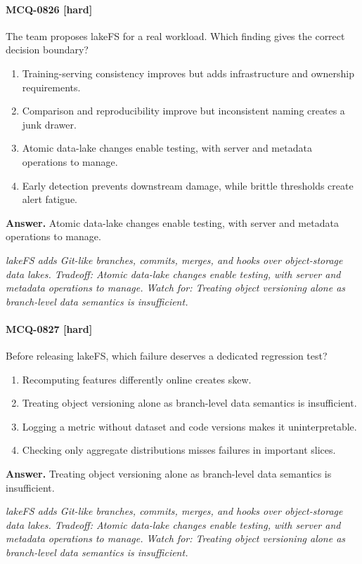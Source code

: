 \paragraph{MCQ-0826 [hard]} The team proposes lakeFS for a real workload. Which finding gives the correct decision boundary?
\begin{enumerate}[label=\Alph*.]
\item Training-serving consistency improves but adds infrastructure and ownership requirements.
\item Comparison and reproducibility improve but inconsistent naming creates a junk drawer.
\item Atomic data-lake changes enable testing, with server and metadata operations to manage.
\item Early detection prevents downstream damage, while brittle thresholds create alert fatigue.
\end{enumerate}
\noindent\textbf{Answer.} Atomic data-lake changes enable testing, with server and metadata operations to manage.
\par\textit{lakeFS adds Git-like branches, commits, merges, and hooks over object-storage data lakes. Tradeoff: Atomic data-lake changes enable testing, with server and metadata operations to manage. Watch for: Treating object versioning alone as branch-level data semantics is insufficient.}
\paragraph{MCQ-0827 [hard]} Before releasing lakeFS, which failure deserves a dedicated regression test?
\begin{enumerate}[label=\Alph*.]
\item Recomputing features differently online creates skew.
\item Treating object versioning alone as branch-level data semantics is insufficient.
\item Logging a metric without dataset and code versions makes it uninterpretable.
\item Checking only aggregate distributions misses failures in important slices.
\end{enumerate}
\noindent\textbf{Answer.} Treating object versioning alone as branch-level data semantics is insufficient.
\par\textit{lakeFS adds Git-like branches, commits, merges, and hooks over object-storage data lakes. Tradeoff: Atomic data-lake changes enable testing, with server and metadata operations to manage. Watch for: Treating object versioning alone as branch-level data semantics is insufficient.}

